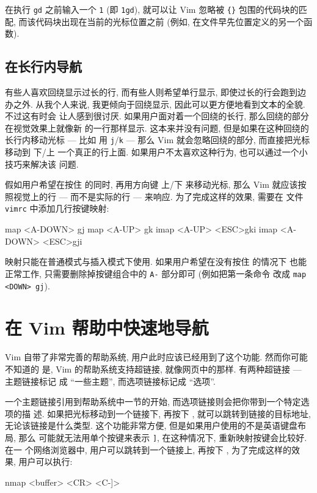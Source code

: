 \begin{tips}
    在执行 \texttt{gd} 之前输入一个 \texttt{1} (即 \texttt{1gd}), 就可以让 Vim 
    忽略被 \verb'{}' 包围的代码块的匹配, 而该代码块出现在当前的光标位置之前
    (例如, 在文件早先位置定义的另一个函数).
\end{tips}

\subsection{在长行内导航}
\label{subsec:navigating_long_lines}

有些人喜欢回绕显示过长的行, 而有些人则希望单行显示, 即使过长的行会跑到边办之外.
从我个人来说, 我更倾向于回绕显示, 因此可以更方便地看到文本的全貌. 不过这有时会
让人感到很讨厌. 如果用户面对着一个回绕的长行, 那么回绕的部分在视觉效果上就像新
的一行那样显示. 这本来并没有问题, 但是如果在这种回绕的长行内移动光标 --- 比如 
用 \texttt{j}/\texttt{k} --- 那么 Vim 就会忽略回绕的部分, 而直接把光标移动到
下/上 一个真正的行上面. 如果用户不太喜欢这种行为, 也可以通过一个小技巧来解决该
问题.

假如用户希望在按住  的同时, 再用方向键 上/下 来移动光标, 那么 Vim 
就应该按照视觉上的行 --- 而不是实际的行 --- 来响应. 为了完成这样的效果, 需要在
文件 \texttt{vimrc} 中添加几行按键映射:
\begin{vimcmd}
map <A-DOWN> gj
map <A-UP> gk
imap <A-UP> <ESC>gki
imap <A-DOWN> <ESC>gji
\end{vimcmd}

映射只能在普通模式与插入模式下使用. 如果用户希望在没有按住  的情况下
也能正常工作, 只需要删除掉按键组合中的 \texttt{A-} 部分即可 (例如把第一条命令
改成 \texttt{map <DOWN> gj}).

\section{在 Vim 帮助中快速地导航}
\label{sec:faster_navigation_in_vim_help}

Vim 自带了非常完善的帮助系统, 用户此时应该已经用到了这个功能. 然而你可能不知道的
是, Vim 的帮助系统支持超链接, 就像网页中的那样. 有两种超链接 --- 主题链接标记
成 ``一些主题'', 而选项链接标记成 ``选项''.

一个主题链接引用到帮助系统中一节的开始, 而选项链接则会把你带到一个特定选项的描
述. 如果把光标移动到一个链接下, 再按下 \key{Ctrl+]}, 就可以跳转到链接的目标地址,
无论该链接是什么类型. 这个功能非常方便, 但是如果用户使用的不是英语键盘布局, 那么
可能就无法用单个按键来表示 \texttt{]}, 在这种情况下, 重新映射按键会比较好. 在一
个网络浏览器中, 用户可以跳转到一个链接上, 再按下 , 为了完成这样的效 
果, 用户可以执行:
\begin{vimcmd}
nmap <buffer> <CR> <C-]>
\end{vimcmd}


